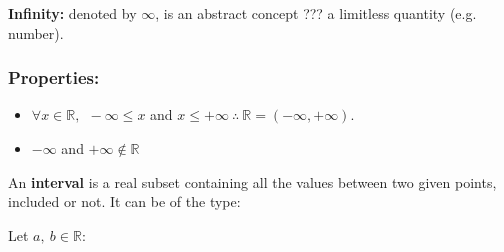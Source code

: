 \documentclass[12pt, a4paper]{book}
\begin{document}
\begin{defn}
  \textbf{Infinity:} denoted by $\infty$, is an abstract concept ??? a limitless quantity (e.g. number).
\end{defn}

\subsubsection*{Properties:}

\begin{itemize}
  \item $\forall x \in \mathbb{R}, \ \ - \infty \leq x$ and $x \leq + \infty \ \therefore \ \mathbb{R}=(-\infty, +\infty).$
  \item $-\infty$ and $+\infty \notin \mathbb{R}$
\end{itemize}

\begin{defn}
  An \textbf{interval} is a real subset containing all the values between two given points, included or not. It can be of the type: 
  
  Let $a, \ b \in \mathbb{R}$:

\end{defn}
\end{document}
